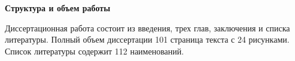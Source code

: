 
\textbf{Структура и объем работы}

Диссертационная работа состоит из введения, трех глав, заключения и списка литературы. Полный объем диссертации 101 страница текста с 24 рисунками. Список литературы содержит 112 наименований.